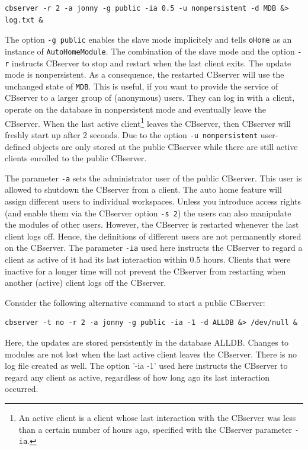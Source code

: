 {\small
\begin{verbatim}
cbserver -r 2 -a jonny -g public -ia 0.5 -u nonpersistent -d MDB &> log.txt &
\end{verbatim}
}

The option {\tt -g public} enables the slave mode implicitely and tells {\tt oHome}
as an instance of {\tt Auto\-Home\-Module}. The combination of the slave mode and the
option {\tt -r} instructs CBserver to stop and
restart when the last client exits.
The update mode is nonpersistent. As a consequence, the restarted CBserver
will use the unchanged state of {\tt MDB}. This is useful, if you want to provide
the service of CBserver to a larger group of (anonymous) users. They can log in
with a client, operate on the database in nonpersistent mode and eventually leave
the CBserver. When the last active client\footnote{An active client is a client 
whose last interaction with the CBserver was less than a certain
number of hours ago, specified with the CBserver parameter {\tt -ia}.}
leaves the CBserver, then CBserver will freshly start up
after 2 seconds. Due to the option {\tt -u nonpersistent}
user-defined objects are only stored at the public CBserver
while there are still active clients enrolled to the public CBserver. 

The parameter {\tt -a} sets the administrator user of the public CBserver. This user
is allowed to shutdown the CBserver from a client.
The auto home feature will assign different users to individual workspaces.
Unless you introduce access rights (and enable them via the CBserver option {\tt -s 2})
the users can also manipulate the modules of other users. However, the CBserver is
restarted whenever the last client logs off. Hence, the definitions of different users
are not permanently stored on the CBserver.
The parameter {\tt -ia} used here instructs the CBserver to regard a client as active of it
had its last interaction within 0.5 hours. Clients that were inactive for a longer
time will not prevent the CBserver from restarting when another (active) client 
logs off the CBserver.

Consider the following alternative command to start a public CBserver:

{\small
\begin{verbatim}
cbserver -t no -r 2 -a jonny -g public -ia -1 -d ALLDB &> /dev/null &
\end{verbatim}
}

Here, the updates are stored persistently in the database ALLDB. Changes to modules are not lost
when the last active client leaves the CBserver. There is no log file created as well.
The option '-ia -1' used here instructs the CBserver to regard any client as active,
regardless of how long ago its last interaction occurred.


